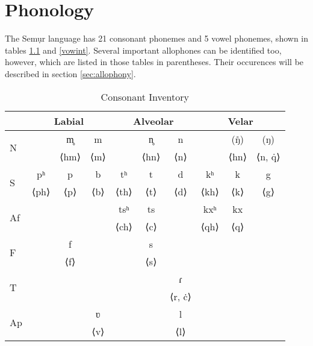 \documentclass[paper=6in:9in]{scrbook}
\title{\langname}
\author{Sascha M. Baer}
\date{}
\newcommand{\orth}[1]{{\lib{}⟨}#1{\lib{}⟩}}
\newcommand{\langname}{Semụr}
\newcommand{\qdot}[0]{q̇}
\renewcommand{\cdot}[0]{ċ}
\begin{document}
\maketitle
\newpage

\tableofcontents
\listoftables

\newpage
\chapter{Phonology}
The \langname{} language has 21 consonant phonemes and 5 vowel phonemes, shown in tables \ref{consint} and \ref{vowint}. Several important allophones can be identified too, however, which are listed in those tables in parentheses. Their occurences will be described in section \ref{sec:allophony}. 

\begin{table}[]
\centering
\begin{tabular}{l|ccc|ccc|ccc}
                   & \multicolumn{3}{c|}{Labial}      & \multicolumn{3}{c|}{Alveolar}    & \multicolumn{3}{c}{Velar}        \\ \hline
\multirow{2}{*}{N}       &           & m̥        & m        &           & n̥        & n        &           &   (ŋ̊)     &    (ŋ)   \\
                             &           & \orth{hm} & \orth{m} &           & \orth{hn} & \orth{n} &           & \orth{hn} & \orth{n, \qdot}  \\
\multirow{2}{*}{S}        & pʰ        & p         & b        & tʰ        & t         & d        & kʰ        & k         & g        \\
                             & \orth{ph} & \orth{p}  & \orth{b} & \orth{th} & \orth{t}  & \orth{d} & \orth{kh} & \orth{k}  & \orth{g} \\
\multirow{2}{*}{Af}   &           &           &          & tsʰ       & ts       &          & kxʰ       & kx       &          \\
                             &           &           &          & \orth{ch} & \orth{c}  &          & \orth{qh} & \orth{q}  &          \\
\multirow{2}{*}{F}   &           & f         &          &           & s         &          &           &           &          \\
                             &           & \orth{f}  &          &           & \orth{s}  &          &           &           &          \\
\multirow{2}{*}{T}         &           &           &          &           &           & ɾ        &           &           &          \\
                             &           &           &          &           &           & \orth{r, \cdot} &           &           &          \\
\multirow{2}{*}{Ap} &           &           & ʋ        &           &           & l        &           &           &          \\
                             &           &           & \orth{v} &           &           & \orth{l} &           &           &         
\end{tabular}
\caption{Consonant Inventory}
\label{consint}
\end{table}
\end{document}
